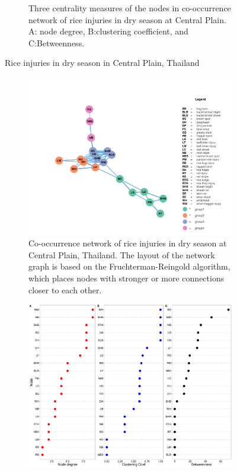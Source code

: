 \begin{figure}
\begin{subfigure}[b]{1\textwidth}
        \caption{Three centrality measures of the nodes in co-occurrence network of rice injuries in dry season at Central Plain. A: node degree, B:clustering coefficient, and C:Betweenness.}
        \label{fig:nodepropCP_ds}
    \end{subfigure}
    \caption{Rice injuries in dry season in Central Plain, Thailand}
    \label{fig:CP_ds}
\end{figure}

\begin{figure}
    \centering
    \begin{subfigure}[b]{1\textwidth}
        \includegraphics[width = 1\textwidth]{figures/networkCP_ws/networkCP_ws.pdf}
        \caption{Co-occurrence network of rice injuries in dry season at Central Plain, Thailand. The layout of the network graph is based on the Fruchterman-Reingold algorithm, which places nodes with stronger or more connections closer to each other.}
        \label{fig:networkCP_ws}
    \end{subfigure}
    \begin{subfigure}[b]{1\textwidth}
        \includegraphics[width = 1\textwidth]{figures/nodepropCP_ws/nodepropCP_ws.pdf}

\end{subfigure}
\end{figure}
